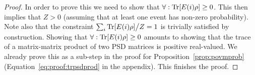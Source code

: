 \begin{proof}
	In order to prove this we need to show that $\forall: \Trace [E(i) \rho ]\geq 0$. This then implies that $Z>0$ (assuming that at least one event has non-zero probability). Note also that the constraint $ \sum_i \Trace [E(i) \rho ] \big/ Z  =1$ is trivially satisfied by construction.
	Showing that  $\forall: \Trace [E(i) \rho ]\geq 0$ amounts to showing that the trace of a matrix-matrix product of two PSD matrices is positive real-valued. We already prove this as a sub-step in the proof for Proposition~\ref{prop:povmprob} (\cf Equation~\ref{eq:proof:trpsdprod} in the appendix). This finishes the proof.
\end{proof}










